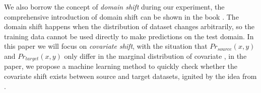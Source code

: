 We also borrow the concept of \textit{domain shift} during our experiment, the comprehensive introduction of domain shift can be shown in the book \cite{quionero2009dataset}. The domain shift happens when the distribution of dataset changes arbitrarily, so the training data cannot be used directly to make predictions on the test domain. In this paper we will focus on \textit{covariate shift}, with the situation that \(Pr_{source}(x,y)\) and \(Pr_{target}(x,y)\) only differ in the marginal distribution of covariate \cite{zhang2013domain}, in the paper, we propose a machine learning method to quickly check whether the covariate shift exists between source and target datasets, ignited by the idea from \cite{coviriate}.






 










